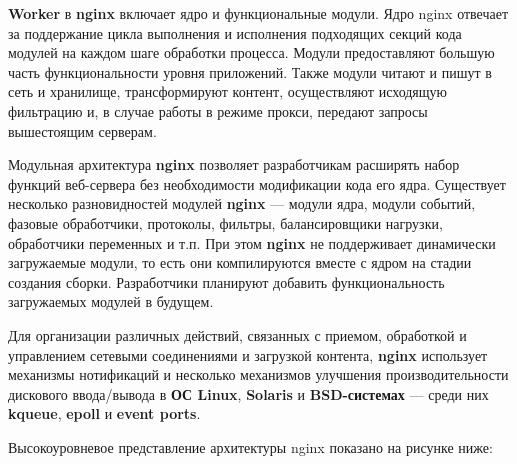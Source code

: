 \documentclass[14pt, a4paper]{article}
\begin{document}
\textbf{Worker} в \textbf{nginx} включает ядро и функциональные модули. Ядро nginx отвечает за поддержание 
цикла выполнения и исполнения подходящих секций кода модулей на каждом шаге обработки процесса. 
Модули предоставляют большую часть функциональности уровня приложений. Также модули читают и 
пишут в сеть и хранилище, трансформируют контент, осуществляют исходящую фильтрацию и, в случае 
работы в режиме прокси, передают запросы вышестоящим серверам.

Модульная архитектура \textbf{nginx} позволяет разработчикам расширять набор функций веб-сервера 
без необходимости модификации кода его ядра. Существует несколько разновидностей модулей 
\textbf{nginx} — модули ядра, модули событий, фазовые обработчики, протоколы, фильтры, балансировщики 
нагрузки, обработчики переменных и т.п. При этом \textbf{nginx} не поддерживает динамически загружаемые 
модули, то есть они компилируются вместе с ядром на стадии создания сборки. Разработчики планируют 
добавить функциональность загружаемых модулей в будущем.

Для организации различных действий, связанных с приемом, обработкой и управлением сетевыми 
соединениями и загрузкой контента, \textbf{nginx} использует механизмы нотификаций и несколько механизмов 
улучшения производительности дискового ввода/вывода в \textbf{ОС Linux}, \textbf{Solaris} и \textbf{BSD-системах} — среди 
них \textbf{kqueue}, \textbf{epoll} и \textbf{event ports}.

Высокоуровневое представление архитектуры nginx показано на рисунке ниже:
\begin{figure}[h]%
    \centering
    \label{1.1}
\end{figure}
\end{document}
